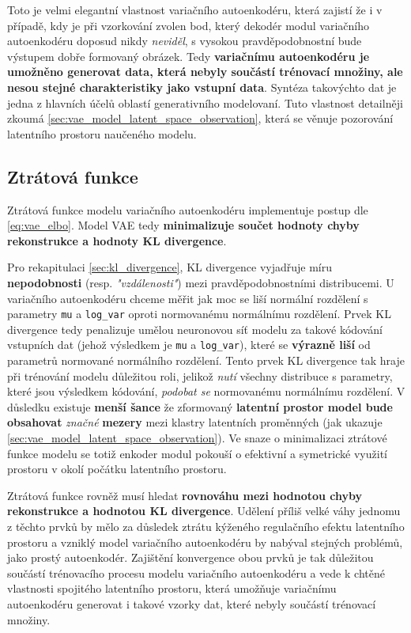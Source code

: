 Toto je velmi elegantní vlastnost variačního autoenkodéru, která zajistí že i v případě, kdy je při vzorkování zvolen bod, který dekodér modul variačního autoenkodéru doposud nikdy \emph{neviděl}, s vysokou pravděpodobnostní bude výstupem dobře formovaný obrázek.
Tedy \textbf{variačnímu autoenkodéru je umožněno generovat data, která nebyly součástí trénovací množiny, ale nesou stejné charakteristiky jako vstupní data}.
Syntéza takovýchto dat je jedna z hlavních účelů oblastí generativního modelovaní.
Tuto vlastnost detailněji zkoumá \autoref{sec:vae_model_latent_space_observation}, která se věnuje pozorování latentního prostoru naučeného modelu.

\subsection{Ztrátová funkce}
\label{sec:vae_model_loss_function}
Ztrátová funkce modelu variačního autoenkodéru implementuje postup dle \autoref{eq:vae_elbo}.
Model VAE tedy \textbf{minimalizuje součet hodnoty chyby rekonstrukce a hodnoty KL divergence}.

Pro rekapitulaci \autoref{sec:kl_divergence}, KL divergence vyjadřuje míru \textbf{nepodobnosti} (resp. \emph{"vzdálenosti"}) mezi pravděpodobnostními distribucemi.
U variačního autoenkodéru chceme měřit jak moc se liší normální rozdělení s parametry \lstinline{mu} a \lstinline{log_var} oproti normovanému normálnímu rozdělení.
Prvek KL divergence tedy penalizuje umělou neuronovou síť modelu za takové kódování vstupních dat (jehož výsledkem je \lstinline{mu} a \lstinline{log_var}), které se \textbf{výrazně liší} od parametrů normované normálního rozdělení.
Tento prvek KL divergence tak hraje při trénování modelu důležitou roli, jelikož \emph{nutí} všechny distribuce s parametry, které jsou výsledkem kódování, \emph{podobat se} normovanému normálnímu rozdělení. 
V důsledku existuje \textbf{menší šance} že zformovaný \textbf{latentní prostor model bude obsahovat} \emph{značné} \textbf{mezery} mezi klastry latentních proměnných (jak ukazuje \autoref{sec:vae_model_latent_space_observation}).
Ve snaze o minimalizaci ztrátové funkce modelu se totiž enkoder modul pokouší o efektivní a symetrické využití prostoru v okolí počátku latentního prostoru.

Ztrátová funkce rovněž musí hledat \textbf{rovnováhu mezi hodnotou chyby rekonstrukce a hodnotou KL divergence}.
Udělení příliš velké váhy jednomu z těchto prvků by mělo za důsledek ztrátu kýženého regulačního efektu latentního prostoru a vzniklý model variačního autoenkodéru by nabýval stejných problémů, jako prostý autoenkodér.
Zajištění konvergence obou prvků je tak důležitou součástí trénovacího procesu modelu variačního autoenkodéru a vede k chtěné vlastnosti spojitého latentního prostoru, která umožňuje variačnímu autoenkodéru generovat i takové vzorky dat, které nebyly součástí trénovací množiny.

